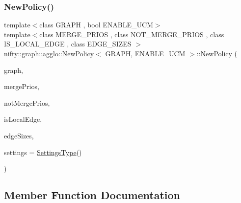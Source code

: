 \subsubsection{\texorpdfstring{New\+Policy()}{NewPolicy()}}
{\footnotesize\ttfamily template$<$class G\+R\+A\+PH , bool E\+N\+A\+B\+L\+E\+\_\+\+U\+CM$>$ \\
template$<$class M\+E\+R\+G\+E\+\_\+\+P\+R\+I\+OS , class N\+O\+T\+\_\+\+M\+E\+R\+G\+E\+\_\+\+P\+R\+I\+OS , class I\+S\+\_\+\+L\+O\+C\+A\+L\+\_\+\+E\+D\+GE , class E\+D\+G\+E\+\_\+\+S\+I\+Z\+ES $>$ \\
\hyperlink{classnifty_1_1graph_1_1agglo_1_1NewPolicy}{nifty\+::graph\+::agglo\+::\+New\+Policy}$<$ G\+R\+A\+PH, E\+N\+A\+B\+L\+E\+\_\+\+U\+CM $>$\+::\hyperlink{classnifty_1_1graph_1_1agglo_1_1NewPolicy}{New\+Policy} (\begin{DoxyParamCaption}\item[{const \hyperlink{classnifty_1_1graph_1_1agglo_1_1NewPolicy_ac8758b09604128d2bded40975109e808}{Graph\+Type} \&}]{graph,  }\item[{const M\+E\+R\+G\+E\+\_\+\+P\+R\+I\+OS \&}]{merge\+Prios,  }\item[{const N\+O\+T\+\_\+\+M\+E\+R\+G\+E\+\_\+\+P\+R\+I\+OS \&}]{not\+Merge\+Prios,  }\item[{const I\+S\+\_\+\+L\+O\+C\+A\+L\+\_\+\+E\+D\+GE \&}]{is\+Local\+Edge,  }\item[{const E\+D\+G\+E\+\_\+\+S\+I\+Z\+ES \&}]{edge\+Sizes,  }\item[{const \hyperlink{structnifty_1_1graph_1_1agglo_1_1NewPolicy_1_1SettingsType}{Settings\+Type} \&}]{settings = {\ttfamily \hyperlink{structnifty_1_1graph_1_1agglo_1_1NewPolicy_1_1SettingsType}{Settings\+Type}()} }\end{DoxyParamCaption})\hspace{0.3cm}{\ttfamily [inline]}}



\subsection{Member Function Documentation}
\mbox{\label{classnifty_1_1graph_1_1agglo_1_1NewPolicy_a7fa5fce0d956a2d35707d6cf66dac566}} 
